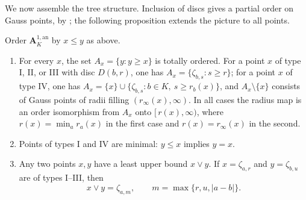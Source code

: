 We now assemble the tree structure.  Inclusion of discs gives a partial
order on Gauss points, by ; the
following proposition extends the picture to all points.

\begin{proposition}
\label{prop:berk-a1-tree}
Order $\mathbf A^{1,\mathrm{an}}_K$ by $x\leq y$ as above.
\begin{enumerate}
\item For every $x$, the set $A_x=\{y:y\geq x\}$ is totally
      ordered.  For a point $x$ of type I, II, or III with disc
      $D(b,r)$, one has $A_x=\{\zeta_{b,s}:s\geq r\}$; for a point
      $x$ of type IV, one has
      $A_x=\{x\}\cup\{\zeta_{b,s}:b\in K,\ s\geq r_b(x)\}$, and
      $A_x\setminus\{x\}$ consists of Gauss points of radii filling
      $(r_\infty(x),\infty)$.  In all cases the radius map is an
      order isomorphism from $A_x$ onto $[\,r(x),\infty)$, where
      $r(x)=\min_ar_a(x)$ in the first case and
      $r(x)=r_\infty(x)$ in the second.
\item Points of types I and IV are minimal: $y\leq x$ implies
      $y=x$.
\item Any two points $x,y$ have a least upper bound $x\vee y$.
      If $x=\zeta_{a,r}$ and $y=\zeta_{b,u}$ are of types I--III,
      then
      \[
       x\vee y=\zeta_{a,m},\qquad m=\max\{r,u,|a-b|\}.
      \]
\end{enumerate}
\end{proposition}

